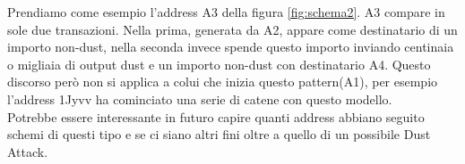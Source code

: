 \FloatBarrier
Prendiamo come esempio l'address A3 della figura \ref{fig:schema2}. A3 compare in sole due transazioni. Nella prima, generata da A2, appare come destinatario di un importo non-dust, nella seconda invece spende questo importo inviando centinaia o migliaia di output dust e un importo non-dust con destinatario A4. Questo discorso però non si applica a colui che inizia questo pattern(A1), per esempio l'address 1Jyvv ha cominciato una serie di catene con questo modello.\\Potrebbe essere interessante in futuro capire quanti address abbiano seguito schemi di questi tipo e se ci siano altri fini oltre a quello di un possibile Dust Attack.